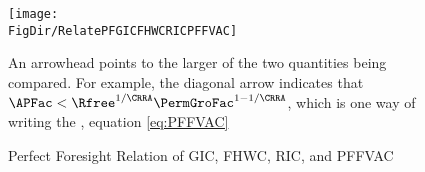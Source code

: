 \begin{figure}[ht]
  \centerline{
    \texttt{[image: \\FigDir/RelatePFGICFHWCRICPFFVAC]}
  }
  \caption{Perfect Foresight Relation of {GIC}, {FHWC}, {RIC}, and {PFFVAC}}
  \footnotesize{An arrowhead points to the larger of the two quantities being compared.  For example, the diagonal arrow indicates that $\APFac < \Rfree^{1/\CRRA}\PermGroFac^{1-1/\CRRA}$, which is one way of writing the {\PFFVAC}, equation \eqref{eq:PFFVAC}}
\end{figure}

